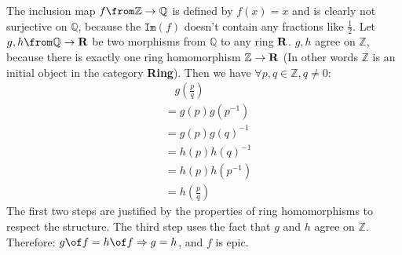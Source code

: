 \begin{answer}
  The inclusion map $f \from \mathbb{Z} \to \mathbb{Q}$ is defined by
  $f(x) = x$ and is clearly not surjective on $\mathbb{Q}$, because
  the $\texttt{Im}(f)$ doesn't contain any fractions like $\frac{1}{2}$.
  Let $g,h \from \mathbb{Q} \to \bf{R}$ be two morphisms from
  $\mathbb{Q}$ to any ring $\bf{R}$.
  $g,h$ agree on $\mathbb{Z}$, because there is exactly one ring
  homomorphism $\mathbb{Z} \to \bf{R}$ (In other words $\mathbb{Z}$
  is an initial object in the category \textbf{Ring}).
  Then we have $\forall p,q \in \mathbb{Z}, q \neq 0$:
  \[
    \begin{aligned}
      & \ \ \ \ g(\frac{p}{q})\\
      &= g(p) g(p^{-1})\\
      &= g(p) g(q)^{-1}\\
      &= h(p) h(q)^{-1}\\
      &= h(p) h(p^{-1})\\
      &= h(\frac{p}{q})
    \end{aligned}
  \]
  The first two steps are justified by the
  properties of ring homomorphisms to respect the structure.
  The third step uses the fact that $g$ and $h$ agree on
  $\mathbb{Z}$.\\
  Therefore: $g \of f = h \of f \Rightarrow g = h$, and $f$ is epic.
\end{answer}



